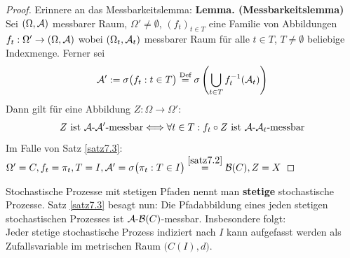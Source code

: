 \begin{proof}
	Erinnere an das Messbarkeitslemma:\nl
	\textbf{Lemma. (Messbarkeitslemma)}\\
	Sei $(\Omega,\mathcal{A})$ messbarer Raum, $\Omega'\neq\emptyset$, $(f_t)_{t\in T}$ eine Familie von Abbildungen\\ $f_t:\Omega'\to(\Omega,\mathcal{A})$ wobei $(\Omega_t,\mathcal{A}_t)$ messbarer Raum für alle $t\in T$, $T\neq\emptyset$ beliebige Indexmenge. 
	Ferner sei
	\begin{align*}
		\mathcal{A}':=\sigma\big(f_t:t\in T\big)\stackrel{\text{Def}}{=}\sigma\left(\bigcup\limits_{t\in T} f_t^{-1}(\mathcal{A}_t)\right)
	\end{align*}
	Dann gilt für eine Abbildung $Z:\Omega\to\Omega'$:
	\begin{align*}
		Z\text{ ist }\mathcal{A}\text{-}\mathcal{A}'\text{-messbar}\Longleftrightarrow\forall t\in T: f_t\circ Z\text{ ist }\mathcal{A}\text{-}\mathcal{A}_t\text{-messbar}
	\end{align*}
	Im Falle von Satz \ref{satz7.3}: $\Omega'=C, f_t=\pi_t, T=I,\mathcal{A}'=\sigma\big(\pi_t:T\in I\big)\stackrel{\ref{satz7.2}}{=}\mathcal{B}(C),Z=X$
\end{proof}

Stochastische Prozesse mit stetigen Pfaden nennt man \textbf{stetige} stochastische Prozesse. 
Satz \ref{satz7.3} besagt nun: 
Die Pfadabbildung eines jeden stetigen stochastischen Prozesses ist $\mathcal{A}\text{-}\mathcal{B}(C)$-messbar. 
Insbesondere folgt:\\
Jeder stetige stochastische Prozess indiziert nach $I$ kann aufgefasst werden als Zufallsvariable im metrischen Raum $\big(C(I),d\big)$.

